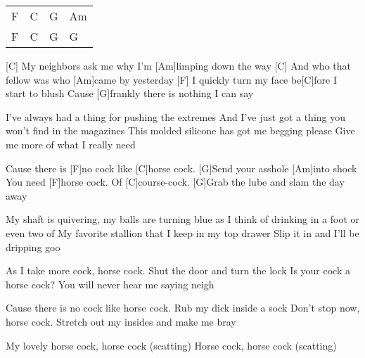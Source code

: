 

\begin{guitar}
	
	{\footnotesize\begin{tabular}{l|l|l|l}
			F & C & G & Am \\
			F & C & G & G 
	\end{tabular}}
	
	[C] My neighbors ask me why I'm [Am]limping down the way
	[C] And who that fellow was who [Am]came by yesterday
	[F] I quickly turn my face be[C]fore I start to blush
	Cause [G]frankly there is nothing I can say
	
	I've always had a thing for pushing the extremes
	And I've just got a thing you won't find in the magazines
	This molded silicone has got me begging please
	Give me more of what I really need
	
	Cause there is [F]no cock like [C]horse cock. [G]Send your asshole [Am]into shock
	You need [F]horse cock. Of [C]course-cock. [G]Grab the lube and slam the day away
	
	My shaft is quivering, my balls are turning blue as
	I think of drinking in a foot or even two of
	My favorite stallion that I keep in my top drawer
	Slip it in and I'll be dripping goo
	
	As I take more cock, horse cock. Shut the door and turn the lock
	Is your cock a horse cock? You will never hear me saying neigh
	
	Cause there is no cock like horse cock. Rub my dick inside a sock
	Don't stop now, horse cock. Stretch out my insides and make me bray
	
	My lovely horse cock, horse cock (scatting)
	Horse cock, horse cock (scatting)
\end{guitar}